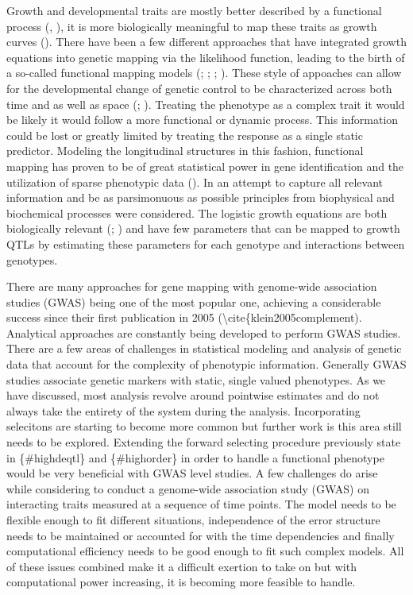 \documentclass[11pt,]{book}
\theoremstyle{definition}
\theoremstyle{definition}
\theoremstyle{remark}
\begin{document}
Growth and developmental traits are mostly better described by a
functional process (\cite{hernandez2015understanding},
\cite{muraya2017genetic}), it is more biologically meaningful to map
these traits as growth curves (\cite{sun2015mapping}). There have been a
few different approaches that have integrated growth equations into
genetic mapping via the likelihood function, leading to the birth of a
so-called functional mapping models (\cite{ma2002functional};
\cite{wu2006functional}; \cite{li2015dynamic};
\cite{muraya2017genetic}). These style of appoaches can allow for the
developmental change of genetic control to be characterized across both
time and as well as space (\cite{he2010mapping};
\cite{li2010functional}). Treating the phenotype as a complex trait it
would be likely it would follow a more functional or dynamic process.
This information could be lost or greatly limited by treating the
response as a single static predictor. Modeling the longitudinal
structures in this fashion, functional mapping has proven to be of great
statistical power in gene identification and the utilization of sparse
phenotypic data (\cite{hou2006framework}). In an attempt to capture all
relevant information and be as parsimonuous as possible principles from
biophysical and biochemical processes were considered. The logistic
growth equations are both biologically relevant (\cite{west2001general};
\cite{sun2014model}) and have few parameters that can be mapped to
growth QTLs by estimating these parameters for each genotype and
interactions between genotypes.

There are many approaches for gene mapping with genome-wide association
studies (GWAS) being one of the most popular one, achieving a
considerable success since their first publication in 2005
(\textbackslash{}cite\{klein2005complement). Analytical approaches are
constantly being developed to perform GWAS studies. There are a few
areas of challenges in statistical modeling and analysis of genetic data
that account for the complexity of phenotypic information. Generally
GWAS studies associate genetic markers with static, single valued
phenotypes. As we have discussed, most analysis revolve around pointwise
estimates and do not always take the entirety of the system during the
analysis. Incorporating selecitons are starting to become more common
but further work is this area still needs to be explored. Extending the
forward selecting procedure previously state in \{\#highdeqtl\} and
\{\#highorder\} in order to handle a functional phenotype would be very
beneficial with GWAS level studies. A few challenges do arise while
considering to conduct a genome-wide association study (GWAS) on
interacting traits measured at a sequence of time points. The model
needs to be flexible enough to fit different situations, independence of
the error structure needs to be maintained or accounted for with the
time dependencies and finally computational efficiency needs to be good
enough to fit such complex models. All of these issues combined make it
a difficult exertion to take on but with computational power increasing,
it is becoming more feasible to handle.
\end{document}
